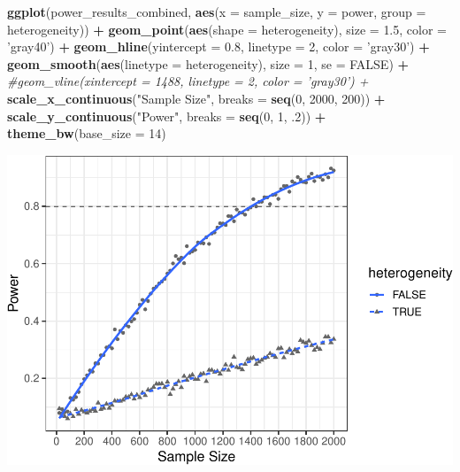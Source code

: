\documentclass[man]{apa6}
\newenvironment{Shaded}{\begin{snugshade}}{\end{snugshade}}
\newcommand{\CommentTok}[1]{\textcolor[rgb]{0.56,0.35,0.01}{\textit{#1}}}
\newcommand{\DataTypeTok}[1]{\textcolor[rgb]{0.13,0.29,0.53}{#1}}
\newcommand{\DecValTok}[1]{\textcolor[rgb]{0.00,0.00,0.81}{#1}}
\newcommand{\FloatTok}[1]{\textcolor[rgb]{0.00,0.00,0.81}{#1}}
\newcommand{\KeywordTok}[1]{\textcolor[rgb]{0.13,0.29,0.53}{\textbf{#1}}}
\newcommand{\NormalTok}[1]{#1}
\newcommand{\OperatorTok}[1]{\textcolor[rgb]{0.81,0.36,0.00}{\textbf{#1}}}
\newcommand{\OtherTok}[1]{\textcolor[rgb]{0.56,0.35,0.01}{#1}}
\newcommand{\StringTok}[1]{\textcolor[rgb]{0.31,0.60,0.02}{#1}}
\begin{document}
\begin{Shaded}
\begin{Highlighting}[]
\KeywordTok{ggplot}\NormalTok{(power_results_combined, }\KeywordTok{aes}\NormalTok{(}\DataTypeTok{x =}\NormalTok{ sample_size, }\DataTypeTok{y =}\NormalTok{ power, }
                          \DataTypeTok{group =}\NormalTok{ heterogeneity)) }\OperatorTok{+}\StringTok{ }
\StringTok{  }\KeywordTok{geom_point}\NormalTok{(}\KeywordTok{aes}\NormalTok{(}\DataTypeTok{shape =}\NormalTok{ heterogeneity), }\DataTypeTok{size =} \FloatTok{1.5}\NormalTok{, }\DataTypeTok{color =} \StringTok{'gray40'}\NormalTok{) }\OperatorTok{+}\StringTok{ }
\StringTok{  }\KeywordTok{geom_hline}\NormalTok{(}\DataTypeTok{yintercept =} \FloatTok{0.8}\NormalTok{, }\DataTypeTok{linetype =} \DecValTok{2}\NormalTok{, }\DataTypeTok{color =} \StringTok{'gray30'}\NormalTok{) }\OperatorTok{+}\StringTok{ }
\StringTok{  }\KeywordTok{geom_smooth}\NormalTok{(}\KeywordTok{aes}\NormalTok{(}\DataTypeTok{linetype =}\NormalTok{ heterogeneity), }\DataTypeTok{size =} \DecValTok{1}\NormalTok{, }\DataTypeTok{se =} \OtherTok{FALSE}\NormalTok{) }\OperatorTok{+}
\StringTok{  }\CommentTok{#geom_vline(xintercept = 1488, linetype = 2, color = 'gray30') +}
\StringTok{  }\KeywordTok{scale_x_continuous}\NormalTok{(}\StringTok{"Sample Size"}\NormalTok{, }\DataTypeTok{breaks =} \KeywordTok{seq}\NormalTok{(}\DecValTok{0}\NormalTok{, }\DecValTok{2000}\NormalTok{, }\DecValTok{200}\NormalTok{)) }\OperatorTok{+}\StringTok{ }
\StringTok{  }\KeywordTok{scale_y_continuous}\NormalTok{(}\StringTok{"Power"}\NormalTok{, }\DataTypeTok{breaks =} \KeywordTok{seq}\NormalTok{(}\DecValTok{0}\NormalTok{, }\DecValTok{1}\NormalTok{, }\FloatTok{.2}\NormalTok{)) }\OperatorTok{+}
\StringTok{  }\KeywordTok{theme_bw}\NormalTok{(}\DataTypeTok{base_size =} \DecValTok{14}\NormalTok{)}
\end{Highlighting}
\end{Shaded}

\includegraphics{power_simulation_files/figure-latex/simglm-power-curve-h-1.pdf}
\end{document}
